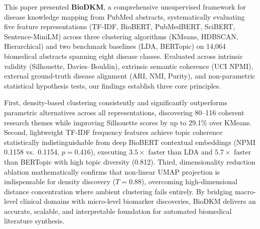 \documentclass[a4paper,10pt,conference]{IEEEtran}
\begin{document}
This paper presented \textbf{BioDKM}, a comprehensive unsupervised framework for disease knowledge mapping from PubMed abstracts, systematically evaluating five feature representations (TF-IDF, BioBERT, PubMedBERT, SciBERT, Sentence-MiniLM) across three clustering algorithms (KMeans, HDBSCAN, Hierarchical) and two benchmark baselines (LDA, BERTopic) on 14,064 biomedical abstracts spanning eight disease classes. Evaluated across intrinsic validity (Silhouette, Davies--Bouldin), extrinsic semantic coherence (UCI NPMI), external ground-truth disease alignment (ARI, NMI, Purity), and non-parametric statistical hypothesis tests, our findings establish three core principles.

First, density-based clustering consistently and significantly outperforms parametric alternatives across all representations, discovering 80--116 coherent research themes while improving Silhouette scores by up to 29.1\% over KMeans. Second, lightweight TF-IDF frequency features achieve topic coherence statistically indistinguishable from deep BioBERT contextual embeddings (NPMI 0.1158 vs.\ 0.1154, $p=0.416$), executing $3.5\times$ faster than LDA and $5.7\times$ faster than BERTopic with high topic diversity (0.812). Third, dimensionality reduction ablation mathematically confirms that non-linear UMAP projection is indispensable for density discovery ($T=0.88$), overcoming high-dimensional distance concentration where ambient clustering fails entirely. By bridging macro-level clinical domains with micro-level biomarker discoveries, BioDKM delivers an accurate, scalable, and interpretable foundation for automated biomedical literature synthesis.
\end{document}
